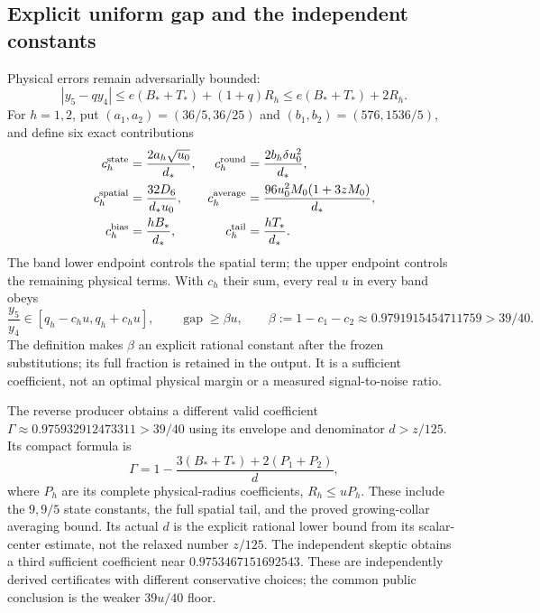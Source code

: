 \subsection{Explicit uniform gap and the independent constants}
Physical errors remain adversarially bounded:
\begin{equation}
 |y_5-qy_4|\le e(B_*+T_*)+(1+q)R_h
 \le e(B_*+T_*)+2R_h.
 \label{r28:eq:ai4-full-numerator}
\end{equation}
For $h=1,2$, put $(a_1,a_2)=(36/5,36/25)$ and $(b_1,b_2)=(576,1536/5)$, and define six exact contributions
\begin{align}
 c_h^{\rm state}&=\frac{2a_h\sqrt{u_0}}{d_*},&
 c_h^{\rm round}&=\frac{2b_h\delta u_0^2}{d_*},\notag\\
 c_h^{\rm spatial}&=\frac{32D_6}{d_*u_0},&
 c_h^{\rm average}&=\frac{96u_0^2M_0(1+3zM_0)}{d_*},\notag\\
 c_h^{\rm bias}&=\frac{hB_*}{d_*},&
 c_h^{\rm tail}&=\frac{hT_*}{d_*}.
 \label{r28:eq:ai4-radius-coefficients}
\end{align}
The band lower endpoint controls the spatial term; the upper endpoint controls the remaining physical terms. With $c_h$ their sum, every real $u$ in every band obeys
\begin{equation}
 \frac{y_5}{y_4}\in[q_h-c_hu,q_h+c_hu],\qquad
 \operatorname{gap}\ge\beta u,\qquad
 \beta:=1-c_1-c_2\approx0.9791915454711759>39/40.
 \label{r28:eq:ai4-uniform-result}
\end{equation}
The definition makes $\beta$ an explicit rational constant after the frozen substitutions; its full fraction is retained in the output. It is a sufficient coefficient, not an optimal physical margin or a measured signal-to-noise ratio.

The reverse producer obtains a different valid coefficient $\Gamma\approx0.975932912473311>39/40$ using its envelope and denominator $d>z/125$. Its compact formula is
\begin{equation}
 \Gamma=1-\frac{3(B_*+T_*)+2(P_1+P_2)}{d},
 \label{r28:eq:ai4-reverse-constant}
\end{equation}
where $P_h$ are its complete physical-radius coefficients, $R_h\le uP_h$. These include the $9,9/5$ state constants, the full spatial tail, and the proved growing-collar averaging bound. Its actual $d$ is the explicit rational lower bound from its scalar-center estimate, not the relaxed number $z/125$. The independent skeptic obtains a third sufficient coefficient near $0.9753467151692543$. These are independently derived certificates with different conservative choices; the common public conclusion is the weaker $39u/40$ floor.

